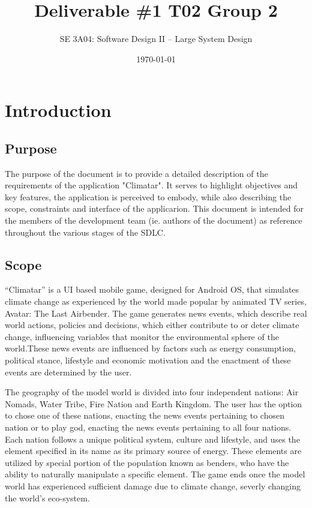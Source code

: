 \documentclass[]{article}
\title{Deliverable \#1 T02 Group 2}
\author{SE 3A04: Software Design II -- Large System Design}
\date{\today}
\begin{document}
\maketitle	

\section{Introduction}
\label{sec:introduction}
\subsection{Purpose}
\label{sub:purpose}
	The purpose of the document is to provide a detailed description of the requirements of the application "Climatar". It serves to highlight objectives and key features, the application is perceived to embody, while also describing the scope, constraints and interface of the applicarion. This document is intended for the members of the development team (ie. authors of the document) as reference throughout the various stages of the SDLC.

\subsection{Scope}
\label{sub:scope}
	“Climatar” is a UI based mobile game, designed for Android OS, that simulates climate change as experienced by the world made popular by animated TV series, Avatar: The Last Airbender. The game generates news events, which describe real world actions, policies and decisions, which either contribute to or deter climate change, influencing variables that monitor the environmental sphere of the world.These news events are influenced by factors such as energy consumption, political stance, lifestyle and economic motivation and the enactment of these events are determined by the user.
 
	\cite{WoA}The geography of the model world is divided into four independent nations: Air Nomads, Water Tribe, Fire Nation and Earth Kingdom. The user has the option to chose one of these nations, enacting the news events pertaining to chosen nation or to play god, enacting the news events pertaining to all four nations. Each nation follows a unique political system, culture and lifestyle, and uses the element specified in its name as its primary source of energy. These elements are utilized by special portion of the population known as benders, who have the ability to naturally manipulate a specific element. The game ends once the model world has experienced sufficient damage due to climate change, severly changing the world's eco-system. 
\end{document}
